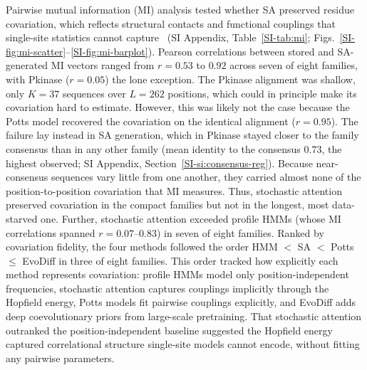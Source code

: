 \documentclass[11pt,onecolumn,twoside,lineno]{pnas-new}
\begin{document}
Pairwise mutual information (MI) analysis tested whether SA preserved residue covariation, which reflects structural contacts and functional couplings that single-site statistics cannot capture~\cite{morcosDirectCouplingAnalysis2011} (SI Appendix, Table~\ref{SI-tab:mi}; Figs.~\ref{SI-fig:mi-scatter}--\ref{SI-fig:mi-barplot}). Pearson correlations between stored and SA-generated MI vectors ranged from $r{=}0.53$ to $0.92$ across seven of eight families, with Pkinase ($r{=}0.05$) the lone exception. The Pkinase alignment was shallow, only $K{=}37$ sequences over $L{=}262$ positions, which could in principle make its covariation hard to estimate. However, this was likely not the case because the Potts model recovered the covariation on the identical alignment ($r{=}0.95$). The failure lay instead in SA generation, which in Pkinase stayed closer to the family consensus than in any other family (mean identity to the consensus $0.73$, the highest observed; SI Appendix, Section~\ref{SI-si:consensus-reg}). Because near-consensus sequences vary little from one another, they carried almost none of the position-to-position covariation that MI measures. Thus, stochastic attention preserved covariation in the compact families but not in the longest, most data-starved one. Further, stochastic attention exceeded profile HMMs (whose MI correlations spanned $r{=}0.07$--$0.83$) in seven of eight families. Ranked by covariation fidelity, the four methods followed the order HMM $<$ SA $<$ Potts $\leq$ EvoDiff in three of eight families. This order tracked how explicitly each method represents covariation: profile HMMs model only position-independent frequencies, stochastic attention captures couplings implicitly through the Hopfield energy, Potts models fit pairwise couplings explicitly, and EvoDiff adds deep coevolutionary priors from large-scale pretraining. That stochastic attention outranked the position-independent baseline suggested the Hopfield energy captured correlational structure single-site models cannot encode, without fitting any pairwise parameters.
\end{document}
